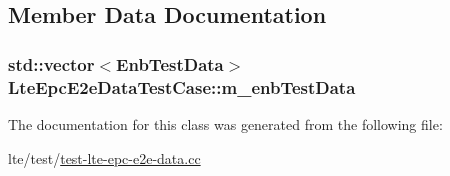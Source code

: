 \subsection{Member Data Documentation}
\subsubsection[{\texorpdfstring{m\+\_\+enb\+Test\+Data}{m_enbTestData}}]{\setlength{\rightskip}{0pt plus 5cm}std\+::vector$<${\bf Enb\+Test\+Data}$>$ Lte\+Epc\+E2e\+Data\+Test\+Case\+::m\+\_\+enb\+Test\+Data\hspace{0.3cm}{\ttfamily [private]}}\hypertarget{classLteEpcE2eDataTestCase_aa2d95eb5a8d25e0d6caa7dbdbe77a85e}{}\label{classLteEpcE2eDataTestCase_aa2d95eb5a8d25e0d6caa7dbdbe77a85e}


The documentation for this class was generated from the following file\+:\begin{DoxyCompactItemize}
\item 
lte/test/\hyperlink{test-lte-epc-e2e-data_8cc}{test-\/lte-\/epc-\/e2e-\/data.\+cc}\end{DoxyCompactItemize}
